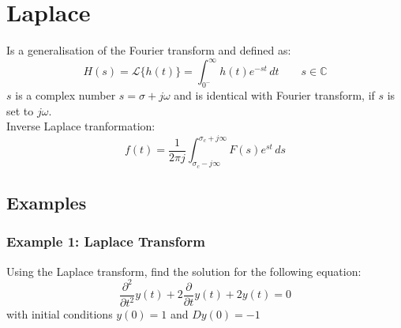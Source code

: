 \section{Laplace}
Is a generalisation of the Fourier transform and defined as:
$$H(s)=\mathcal{L}\{h(t)\}=\int_{0^-}^{\infty}h(t)e^{ -st }  \, dt \quad\quad s \in\mathbb{C}$$
$s$ is a complex number $s=\sigma+j\omega$ and is identical with Fourier transform, if $s$ is set to $j\omega$.\\
Inverse Laplace tranformation:
$$f(t)=\frac{1}{2\pi j}\int_{\sigma_{c}-j\infty}^{\sigma_{c}+j\infty} F(s)e^{ st } \, ds $$
\subsection{Examples}
\subsubsection{Example 1: Laplace Transform}
Using the Laplace transform, find the solution for the following equation:
$$\frac{\partial^{2}}{\partial t^{2}}y(t)+2\frac{\partial}{\partial t}y(t)+2y(t)=0$$
with initial conditions $y (0) = 1$ and $Dy (0) = -1$


